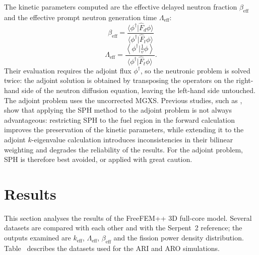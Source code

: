 The kinetic parameters computed are the effective delayed neutron fraction $\beta_{\mathrm{eff}}$ and the effective prompt neutron generation time $\Lambda_{\mathrm{eff}}$:
\begin{equation}
\beta_{\mathrm{eff}} = \frac{\langle\phi^{\dagger}|\hat{F}_d\phi\rangle}{\langle\phi^{\dagger}|\hat{F}_t\phi\rangle}
\label{sph:eq:beta_eff}
\end{equation}
%
\begin{equation}
\Lambda_{\mathrm{eff}} = \frac{\left\langle\phi^{\dagger}|\frac{1}{v}\phi\right\rangle}{\langle\phi^{\dagger}|\hat{F}_t\phi\rangle}.
\label{sph:eq:lambda_eff}
\end{equation}
Their evaluation requires the adjoint flux $\phi^{\dagger}$, so the neutronic problem is solved twice: the adjoint solution is obtained by transposing the operators on the right-hand side of the neutron diffusion equation, leaving the left-hand side untouched. The adjoint problem uses the uncorrected MGXS. Previous studies, such as \citet{takasugi_2023_SPH_kinetic_parameters}, show that applying the SPH method to the adjoint problem is not always advantageous: restricting SPH to the fuel region in the forward calculation improves the preservation of the kinetic parameters, while extending it to the adjoint $k$-eigenvalue calculation introduces inconsistencies in their bilinear weighting and degrades the reliability of the results. For the adjoint problem, SPH is therefore best avoided, or applied with great caution.

\section{Results}

This section analyses the results of the FreeFEM++ 3D full-core model. Several datasets are compared with each other and with the Serpent~2 reference; the outputs examined are $k_{\mathrm{eff}}$, $\Lambda_{\mathrm{eff}}$, $\beta_{\mathrm{eff}}$ and the fission power density distribution. Table~ describes the datasets used for the ARI and ARO simulations.

